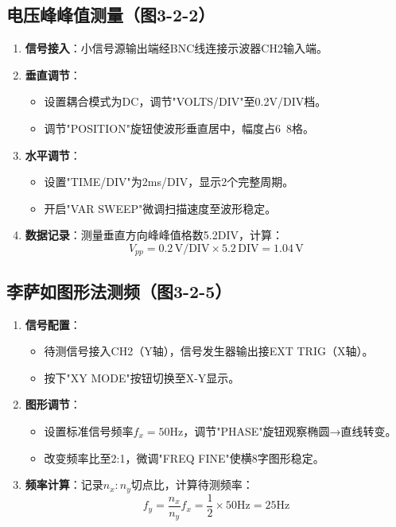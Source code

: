 \documentclass[12pt,a4paper]{article}
\begin{document}
\subsection{电压峰峰值测量（图3-2-2）}

\begin{enumerate}
\item \textbf{信号接入}：小信号源输出端经BNC线连接示波器CH2输入端。
\item \textbf{垂直调节}：
\begin{itemize}
\item 设置耦合模式为DC，调节"VOLTS/DIV"至0.2V/DIV档。
\item 调节"POSITION"旋钮使波形垂直居中，幅度占6~8格。
\end{itemize}
\item \textbf{水平调节}：
\begin{itemize}
\item 设置"TIME/DIV"为2ms/DIV，显示2个完整周期。
\item 开启"VAR SWEEP"微调扫描速度至波形稳定。
\end{itemize}
\item \textbf{数据记录}：测量垂直方向峰峰值格数5.2DIV，计算：
\begin{equation}
V_{pp} = 0.2 \, \text{V/DIV} \times 5.2 \, \text{DIV} = 1.04 \, \text{V}
\end{equation}
\end{enumerate}

\subsection{李萨如图形法测频（图3-2-5）}

\begin{enumerate}
\item \textbf{信号配置}：
\begin{itemize}
\item 待测信号接入CH2（Y轴），信号发生器输出接EXT TRIG（X轴）。
\item 按下"XY MODE"按钮切换至X-Y显示。
\end{itemize}
\item \textbf{图形调节}：
\begin{itemize}
\item 设置标准信号频率$f_x=50\text{Hz}$，调节"PHASE"旋钮观察椭圆→直线转变。
\item 改变频率比至2:1，微调"FREQ FINE"使横8字图形稳定。
\end{itemize}
\item \textbf{频率计算}：记录$n_x:n_y$切点比，计算待测频率：
\begin{equation}
f_y = \frac{n_x}{n_y}f_x = \frac{1}{2} \times 50\text{Hz} = 25\text{Hz}
\end{equation}
\end{enumerate}
\end{document}
